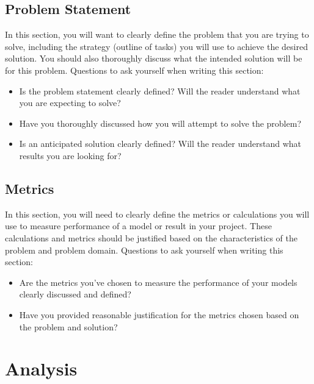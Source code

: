 \documentclass[twoside,openright,titlepage,numbers=noenddot,headinclude,%
               footinclude=true,cleardoublepage=empty,abstractoff,BCOR=5mm,%
               paper=a4,fontsize=11pt,ngerman,american]{scrreprt}
\numberwithin{theorem}{chapter}
\numberwithin{definition}{chapter}
\numberwithin{algorithm}{chapter}
\numberwithin{figure}{chapter}
\numberwithin{table}{chapter}
\numberwithin{equation}{chapter}
\begin{document}
\section*{Problem Statement}

In this section, you will want to clearly define the problem that you are trying to solve, including the strategy (outline of tasks) you will use to achieve the desired solution. You should also thoroughly discuss what the intended solution will be for this problem. Questions to ask yourself when writing this section:

\begin{itemize}%
\item Is the problem statement clearly defined? Will the reader understand what you are expecting to solve?
\item Have you thoroughly discussed how you will attempt to solve the problem?
\item Is an anticipated solution clearly defined? Will the reader understand what results you are looking for?
\end{itemize}


\section*{Metrics}

In this section, you will need to clearly define the metrics or calculations you will use to measure performance of a model or result in your project. These calculations and metrics should be justified based on the characteristics of the problem and problem domain. Questions to ask yourself when writing this section:
\begin{itemize}%
\item Are the metrics you’ve chosen to measure the performance of your models clearly discussed and defined?
\item Have you provided reasonable justification for the metrics chosen based on the problem and solution?
\end{itemize}


\chapter*{Analysis}
\end{document}
